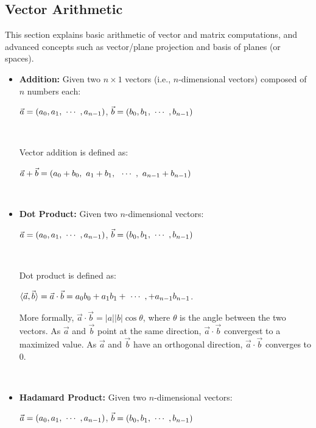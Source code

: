 

\subsection{Vector Arithmetic}
\label{subsec:vector-arithmetic}

This section explains basic arithmetic of vector and matrix computations, and advanced concepts such as vector/plane projection and basis of planes (or spaces). 


\begin{tcolorbox}[title={\textbf{\tboxdef{\ref*{subsec:vector-arithmetic}} Vector Arithmetic}}]

\begin{itemize}
\item \textbf{Addition:} Given two $n \times 1$ vectors (i.e., $n$-dimensional vectors) composed of $n$ numbers each:

$\vec{a} = (a_0, a_1, \text{ } \text{$\cdots$} \text{ }, a_{n-1})$, $\vec{b} = (b_0, b_1, \text{ } \text{$\cdots$} \text{ }, b_{n-1})$

$ $

Vector addition is defined as: 

$ \vec{a} + \vec{b} = (a_0 + b_0, \text{ } a_1  +  b_1, \text{ } \text{ } \text{$\cdots$} \text{ }, \text{ } a_{n-1}  +  b_{n-1})$

$ $

\item \textbf{Dot Product:} Given two $n$-dimensional vectors:

$\vec{a} = (a_0, a_1, \text{ } \text{$\cdots$} \text{ }, a_{n-1})$, $\vec{b} = (b_0, b_1, \text{ } \text{$\cdots$} \text{ }, b_{n-1})$

$ $

Dot product is defined as: 

$\langle \vec{a}, \vec{b} \rangle =  \vec{a} \cdot \vec{b} = a_0 b_0 + a_1 b_1 + \text{ } \text{$\cdots$} \text{ }, + a_{n-1} b_{n-1}$.

More formally, $\vec{a} \cdot \vec{b} = |a||b|\cos\theta$, where $\theta$ is the angle between the two vectors. As $\vec{a}$ and $\vec{b}$ point at the same direction, $\vec{a} \cdot \vec{b}$ convergest to a maximized value. As $\vec{a}$ and $\vec{b}$ have an orthogonal direction, $\vec{a} \cdot \vec{b}$ converges to  0. 

$ $


\item \textbf{Hadamard Product:} Given two $n$-dimensional vectors:

$\vec{a} = (a_0, a_1, \text{ } \text{$\cdots$} \text{ }, a_{n-1})$, $\vec{b} = (b_0, b_1, \text{ } \text{$\cdots$} \text{ }, b_{n-1})$


\end{itemize}
\end{tcolorbox}
